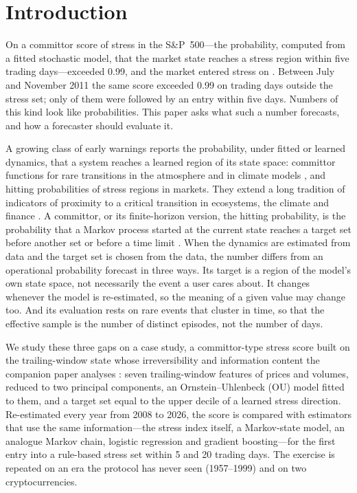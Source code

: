 \documentclass[preprint,12pt,authoryear]{elsarticle}
\begin{document}
\section{Introduction}
On \AlarmElevenDate a committor score of stress in the S\&P~500---the probability, computed from a fitted stochastic model, that the market state reaches a stress region within five trading days---exceeded 0.99, and the market entered stress on \EntryElevenDate. Between July and November 2011 the same score exceeded 0.99 on \SatEleven trading days outside the stress set; only \SatElevenHit of them were followed by an entry within five days. Numbers of this kind look like probabilities. This paper asks what such a number forecasts, and how a forecaster should evaluate it.

A growing class of early warnings reports the probability, under fitted or learned dynamics, that a system reaches a learned region of its state space: committor functions for rare transitions in the atmosphere \citep{finkel2021,miloshevich2023} and in climate models \citep{lucente2022}, and hitting probabilities of stress regions in markets. They extend a long tradition of indicators of proximity to a critical transition in ecosystems, the climate and finance \citep{scheffer2009,dakos2012}. A committor, or its finite-horizon version, the hitting probability, is the probability that a Markov process started at the current state reaches a target set before another set or before a time limit \citep{e2010}. When the dynamics are estimated from data and the target set is chosen from the data, the number differs from an operational probability forecast in three ways. Its target is a region of the model's own state space, not necessarily the event a user cares about. It changes whenever the model is re-estimated, so the meaning of a given value may change too. And its evaluation rests on rare events that cluster in time, so that the effective sample is the number of distinct episodes, not the number of days.

We study these three gaps on a case study, a committor-type stress score built on the trailing-window state whose irreversibility and information content the companion paper analyses \citep{xingpan2026}: seven trailing-window features of prices and volumes, reduced to two principal components, an Ornstein--Uhlenbeck (OU) model fitted to them, and a target set equal to the upper decile of a learned stress direction. Re-estimated every year from 2008 to 2026, the score is compared with estimators that use the same information---the stress index itself, a Markov-state model, an analogue Markov chain, logistic regression and gradient boosting---for the first entry into a rule-based stress set within 5 and 20 trading days. The exercise is repeated on an era the protocol has never seen (1957--1999) and on two cryptocurrencies.
\end{document}
